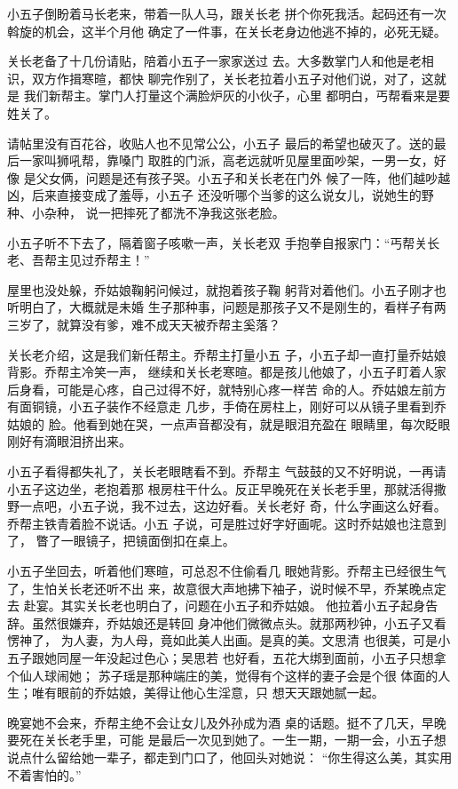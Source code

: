 小五子倒盼着马长老来，带着一队人马，跟关长老
拼个你死我活。起码还有一次斡旋的机会，这半个月他
确定了一件事，在关长老身边他逃不掉的，必死无疑。

关长老备了十几份请贴，陪着小五子一家家送过
去。大多数掌门人和他是老相识，双方作揖寒暄，都快
聊完作别了，关长老拉着小五子对他们说，对了，这就是
我们新帮主。掌门人打量这个满脸炉灰的小伙子，心里
都明白，丐帮看来是要姓关了。

请帖里没有百花谷，收贴人也不见常公公，小五子
最后的希望也破灭了。送的最后一家叫狮吼帮，靠嗓门
取胜的门派，高老远就听见屋里面吵架，一男一女，好像
是父女俩，问题是还有孩子哭。小五子和关长老在门外
候了一阵，他们越吵越凶，后来直接变成了羞辱，小五子
还没听哪个当爹的这么说女儿，说她生的野种、小杂种，
说一把摔死了都洗不净我这张老脸。

小五子听不下去了，隔着窗子咳嗽一声，关长老双
手抱拳自报家门：“丐帮关长老、吾帮主见过乔帮主！”

屋里也没处躲，乔姑娘鞠躬问候过，就抱着孩子鞠
躬背对着他们。小五子刚才也听明白了，大概就是未婚
生子那种事，问题是那孩子又不是刚生的，看样子有两
三岁了，就算没有爹，难不成天天被乔帮主奚落？

关长老介绍，这是我们新任帮主。乔帮主打量小五
子，小五子却一直打量乔姑娘背影。乔帮主冷笑一声，
继续和关长老寒暄。都是孩儿他娘了，小五子盯着人家
后身看，可能是心疼，自己过得不好，就特别心疼一样苦
命的人。乔姑娘左前方有面铜镜，小五子装作不经意走
几步，手倚在房柱上，刚好可以从镜子里看到乔姑娘的
脸。他看到她在哭，一点声音都没有，就是眼泪充盈在
眼睛里，每次眨眼刚好有滴眼泪挤出来。

小五子看得都失礼了，关长老眼瞎看不到。乔帮主
气鼓鼓的又不好明说，一再请小五子这边坐，老抱着那
根房柱干什么。反正早晚死在关长老手里，那就活得撒
野一点吧，小五子说，我不过去，这边好看。关长老好
奇，什么字画这么好看。乔帮主铁青着脸不说话。小五
子说，可是胜过好字好画呢。这时乔姑娘也注意到了，
瞥了一眼镜子，把镜面倒扣在桌上。

小五子坐回去，听着他们寒暄，可总忍不住偷看几
眼她背影。乔帮主已经很生气了，生怕关长老还听不出
来，故意很大声地拂下袖子，说时候不早，乔某晚点定去
赴宴。其实关长老也明白了，问题在小五子和乔姑娘。
他拉着小五子起身告辞。虽然很嫌弃，乔姑娘还是转回
身冲他们微微点头。就那两秒钟，小五子又看愣神了，
为人妻，为人母，竟如此美人出画。是真的美。文思清
也很美，可是小五子跟她同屋一年没起过色心；吴思若
也好看，五花大绑到面前，小五子只想拿个仙人球闹她；
苏子瑶是那种端庄的美，觉得有个这样的妻子会是个很
体面的人生；唯有眼前的乔姑娘，美得让他心生淫意，只
想天天跟她腻一起。

晚宴她不会来，乔帮主绝不会让女儿及外孙成为酒
桌的话题。挺不了几天，早晚要死在关长老手里，可能
是最后一次见到她了。一生一期，一期一会，小五子想
说点什么留给她一辈子，都走到门口了，他回头对她说：
“你生得这么美，其实用不着害怕的。”

